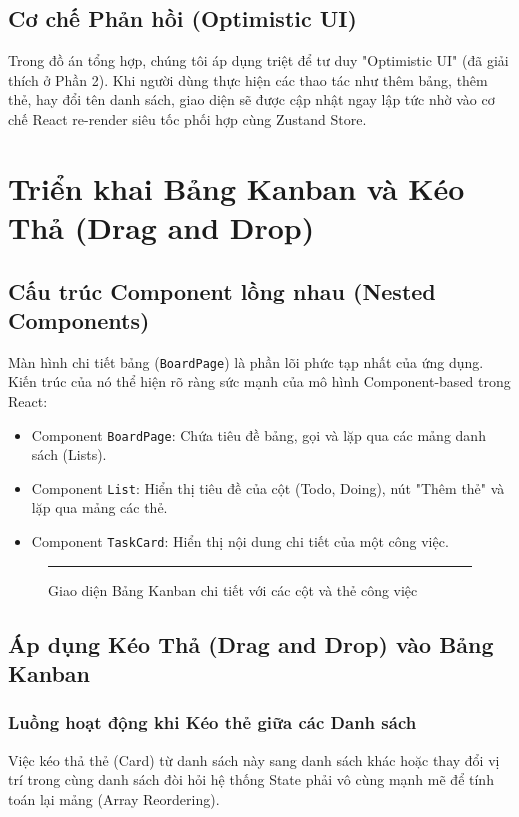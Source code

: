 \section{Cơ chế Phản hồi (Optimistic UI)}
Trong đồ án tổng hợp, chúng tôi áp dụng triệt để tư duy "Optimistic UI" (đã giải thích ở Phần 2). Khi người dùng thực hiện các thao tác như thêm bảng, thêm thẻ, hay đổi tên danh sách, giao diện sẽ được cập nhật ngay lập tức nhờ vào cơ chế React re-render siêu tốc phối hợp cùng Zustand Store.

\chapter{Triển khai Bảng Kanban và Kéo Thả (Drag and Drop)}

\section{Cấu trúc Component lồng nhau (Nested Components)}
Màn hình chi tiết bảng (\texttt{BoardPage}) là phần lõi phức tạp nhất của ứng dụng. Kiến trúc của nó thể hiện rõ ràng sức mạnh của mô hình Component-based trong React:
\begin{itemize}
    \item Component \texttt{BoardPage}: Chứa tiêu đề bảng, gọi và lặp qua các mảng danh sách (Lists).
    \item Component \texttt{List}: Hiển thị tiêu đề của cột (Todo, Doing), nút "Thêm thẻ" và lặp qua mảng các thẻ.
    \item Component \texttt{TaskCard}: Hiển thị nội dung chi tiết của một công việc.
\end{itemize}

\begin{figure}[H]
    \centering
    \rule{0.9\textwidth}{0.6\textwidth}
    \caption{Giao diện Bảng Kanban chi tiết với các cột và thẻ công việc}
\end{figure}

\section{Áp dụng Kéo Thả (Drag and Drop) vào Bảng Kanban}

\subsection{Luồng hoạt động khi Kéo thẻ giữa các Danh sách}
Việc kéo thả thẻ (Card) từ danh sách này sang danh sách khác hoặc thay đổi vị trí trong cùng danh sách đòi hỏi hệ thống State phải vô cùng mạnh mẽ để tính toán lại mảng (Array Reordering).

